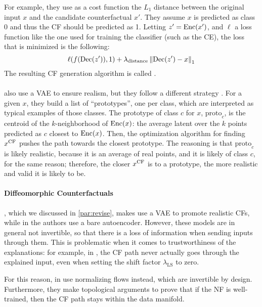 \documentclass[../main.tex]{subfiles}
\begin{document}
For example, they use as a cost function the $L_1$ distance between the original input $x$ and the candidate counterfactual $x'$.
They assume $x$ is predicted as class 0 and thus the CF should be predicted as 1.
Letting $z'=\operatorname{Enc}(x')$, and $\ell$ a loss function like the one used for training the classifier (such as the CE), the loss that is minimized is the following:
\begin{equation}
	\ell(f(\operatorname{Dec}(z')), 1)
	+ \lambda_\text{distance} \left\lVert\operatorname{Dec}(z') - x\right\rVert_1
\end{equation}
The resulting CF generation algorithm is called \revise{} \cite{joshiRealistic2019}.

\paragraph{}

\citeauthor{vanlooverenInterpretable2021} also use a VAE to ensure realism, but they follow a different strategy \cite{vanlooverenInterpretable2021}.
For a given $x$, they build a list of ``prototypes'', one per class, which are interpreted as typical examples of those classes.
The prototype of class $c$ for $x$, $\text{proto}_c$, is the centroid of the $k$-neighborhood of $\operatorname{Enc}(x)$: the average latent over the $k$ points predicted as $c$ closest to $\operatorname{Enc}(x)$.
Then, the optimization algorithm for finding $x^\mathrm{CF}$ pushes the path towards the closest prototype.
The reasoning is that $\text{proto}_c$ is likely realistic, because it is an average of real points, and it is likely of class $c$, for the same reason; therefore, the closer $x^\mathrm{CF}$ is to a prototype, the more realistic and valid it is likely to be.

\paragraph{Diffeomorphic Counterfactuals}
\label{previous_work:diffeo}

\revise{}, which we discussed in \autoref{par:revise}, makes use a VAE to promote realistic CFs, while in \ls{} the authors use a bare autoencoder.
However, these models are in general not invertible, so that there is a loss of information when sending inputs through them.
This is problematic when it comes to trustworthiness of the explanations: for example, in \ls{}, the CF path never actually goes through the explained input, even when setting the shift factor $\lambda_\text{LS}$ to zero.

For this reason, in \cite{dombrowskiDiffeomorphic2021} \citeauthor{dombrowskiDiffeomorphic2021} use normalizing flows instead, which are invertible by design.
Furthermore, they make topological arguments to prove that if the NF is well-trained, then the CF path stays within the data manifold.
\end{document}
